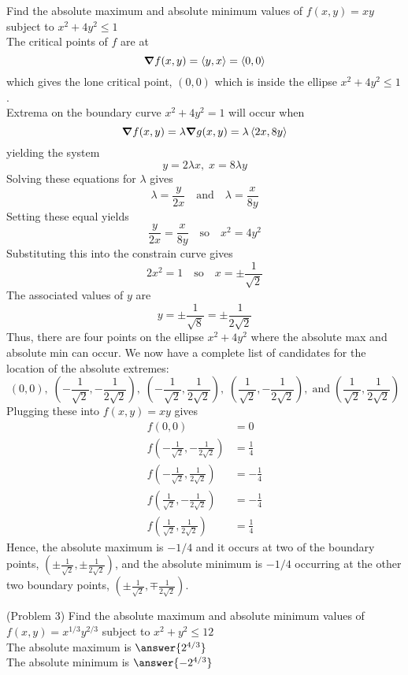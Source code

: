 \documentclass[handout]{ximera}
\begin{document}
\begin{example}[Example 3]
Find the absolute maximum and absolute minimum values of $f(x,y) = xy$ subject to $x^2 + 4y^2 \leq 1$\\
The critical points of $f$ are at
\[
\boldsymbol\nabla f(x,y) = \left\langle y, x\right\rangle = \left\langle 0,0\right\rangle
\]
 which gives the lone critical point, $(0,0)$ which is inside the ellipse $x^2 + 4y^2 \leq 1$.\\
 Extrema on the boundary curve $x^2 + 4y^2 = 1$ will occur when
 \[
 \boldsymbol\nabla f(x,y) = \lambda \boldsymbol\nabla g(x,y) = \lambda \left\langle 2x, 8y\right\rangle
 \]
 yielding the system
 \[
 y = 2\lambda x, \; x = 8\lambda y
 \]
 Solving these equations for $\lambda$ gives
 \[
 \lambda = \frac{y}{2x} \quad \text{and} \quad \lambda = \frac{x}{8y}
 \]
 Setting these equal yields
 \[
 \frac{y}{2x} = \frac{x}{8y} \quad \text{so} \quad x^2 = 4y^2
 \]
Substituting this into the constrain curve gives
\[
2x^2 = 1 \quad \text{so} \quad x = \pm \frac{1}{\sqrt 2}
\]
The associated values of $y$ are 
\[
y = \pm \frac{1}{\sqrt 8} = \pm \frac{1}{2\sqrt 2}
\]
Thus, there are four points on the ellipse $x^2 + 4y^2$ where the absolute max and absolute min can occur.
We now have a complete list of candidates for the location of the absolute extremes:
 \[
 (0,0), \; \left(-\frac{1}{\sqrt 2},-\frac{1}{2\sqrt 2} \right), \; \left(-\frac{1}{\sqrt 2},\frac{1}{2\sqrt 2} \right),
  \; \left(\frac{1}{\sqrt 2},-\frac{1}{2\sqrt 2} \right), \;\text{and} \; \left(\frac{1}{\sqrt 2},\frac{1}{2\sqrt 2} \right)
 \]
 Plugging these into $f(x,y) = xy$ gives
 \begin{align*}
 f(0,0) &= 0\\
 f\left(-\frac{1}{\sqrt 2},-\frac{1}{2\sqrt 2} \right) &= \frac14\\
 f\left(-\frac{1}{\sqrt 2},\frac{1}{2\sqrt 2} \right) &= -\frac14\\
 f\left(\frac{1}{\sqrt 2},-\frac{1}{2\sqrt 2} \right) &= -\frac14\\
 f\left(\frac{1}{\sqrt 2},\frac{1}{2\sqrt 2} \right) &= \frac14
 \end{align*}
 Hence, the absolute maximum is $-1/4$ and it occurs at two of the 
 boundary points, $\left(\pm \frac{1}{\sqrt 2}, \pm \frac{1}{2\sqrt 2}\right)$,
 and the absolute minimum is $-1/4$ occurring at the other two 
 boundary points, $\left(\pm \frac{1}{\sqrt 2}, \mp \frac{1}{2\sqrt 2}\right)$.
 
 
\end{example}

\begin{problem}(Problem 3)
Find the absolute maximum and absolute minimum values of $f(x,y) = x^{1/3}y^{2/3}$ subject to $x^2 + y^2 \leq 12$\\
The absolute maximum is $\answer{2^{4/3}}$\\
The absolute minimum is $\answer{-2^{4/3}}$
\end{problem}
\end{document}
